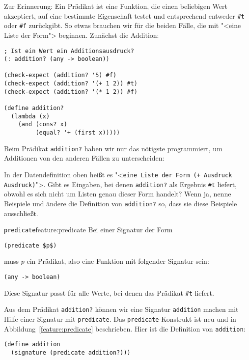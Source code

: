 Zur Erinnerung: Ein Prädikat ist eine Funktion, die
einen beliebigen Wert akzeptiert, auf eine bestimmte Eigenschaft
testet und entsprechend entweder \lstinline{#t} oder \lstinline{#f}
zurückgibt.  So etwas brauchen wir für die beiden Fälle, die mit
"<eine Liste der Form"> beginnen.  Zunächst die Addition:
%
\begin{lstlisting}
; Ist ein Wert ein Additionsausdruck?
(: addition? (any -> boolean))

(check-expect (addition? '5) #f)
(check-expect (addition? '(+ 1 2)) #t)
(check-expect (addition? '(* 1 2)) #f)

(define addition?
  (lambda (x)
    (and (cons? x)
         (equal? '+ (first x)))))
\end{lstlisting}
%
Beim Prädikat \lstinline{addition?} haben wir nur das nötigste
programmiert, um Additionen von den anderen Fällen zu unterscheiden:
\begin{aufgabeinline}
  In der Datendefinition oben heißt es "<\texttt{eine Liste der Form (+
    Ausdruck Ausdruck)}">.  Gibt es Eingaben, bei denen
  \lstinline{addition?} als Ergebnis \lstinline{#t} liefert, obwohl es
  sich nicht um Listen genau dieser Form handelt?  Wenn ja, nenne
  Beispiele und ändere die Definition von \lstinline{addition?} so,
  dass sie diese Beispiele ausschließt.\par %
\end{aufgabeinline}
%
\begin{feature}{\texttt{predicate}}{feature:predicate}
  Bei einer Signatur der Form
\begin{lstlisting}
(predicate $p$)
\end{lstlisting}
  muss $p$ ein Prädikat, also eine Funktion mit folgender Signatur sein:
\begin{lstlisting}
(any -> boolean)
\end{lstlisting}
  Diese Signatur passt für alle Werte, bei denen das Prädikat
  \lstinline{#t} liefert.
\end{feature}
%
Aus dem Prädikat \lstinline{addition?} können wir eine Signatur
\lstinline{addition} machen mit Hilfe einer
Signatur mit \lstinline{predicate}.  Das
\lstinline{predicate}-Konstrukt ist neu und in
Abbildung~\ref{feature:predicate} beschrieben.
Hier ist die Definition von
\lstinline{addition}:
%
\begin{lstlisting}
(define addition
  (signature (predicate addition?)))
\end{lstlisting}
